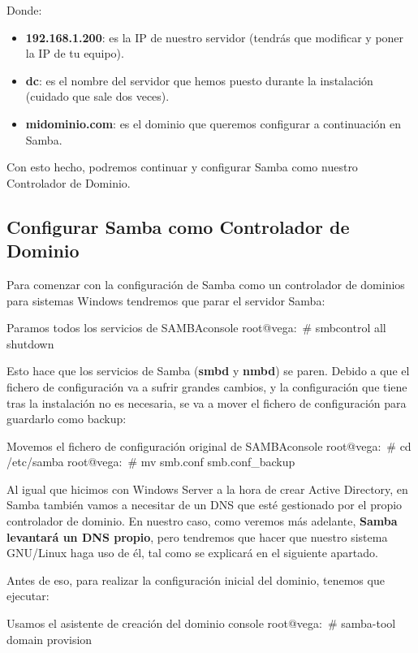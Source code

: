 Donde:
\begin{itemize}
    \item \textbf{192.168.1.200}: es la IP de nuestro servidor (tendrás que modificar y poner la IP de tu equipo).
    \item \textbf{dc}: es el nombre del servidor que hemos puesto durante la instalación (cuidado que sale dos veces).
    \item \textbf{midominio.com}: es el dominio que queremos configurar a continuación en Samba.
\end{itemize}
Con esto hecho, podremos continuar y configurar Samba como nuestro Controlador de Dominio.

\subsection{Configurar Samba como Controlador de Dominio}
Para comenzar con la configuración de Samba como un controlador de dominios para sistemas Windows tendremos que parar el servidor Samba:

\begin{mycode}{Paramos todos los servicios de SAMBA}{console}{}
root@vega:~# smbcontrol all shutdown
\end{mycode}

Esto hace que los servicios de Samba (\textbf{smbd} y \textbf{nmbd}) se paren. Debido a que el fichero de configuración va a sufrir grandes cambios, y la configuración que tiene tras la instalación no es necesaria, se va a mover el fichero de configuración para guardarlo como backup:

\begin{mycode}{Movemos el fichero de configuración original de SAMBA}{console}{}
root@vega:~# cd /etc/samba
root@vega:~# mv smb.conf smb.conf_backup
\end{mycode}

Al igual que hicimos con Windows Server a la hora de crear Active Directory, en Samba también vamos a necesitar de un DNS que esté gestionado por el propio controlador de dominio. En nuestro caso, como veremos más adelante, \textbf{Samba levantará un DNS propio}, pero tendremos que hacer que nuestro sistema GNU/Linux haga uso de él, tal como se explicará en el siguiente apartado.

Antes de eso, para realizar la configuración inicial del dominio, tenemos que ejecutar:

\begin{mycode}{Usamos el asistente de creación del dominio }{console}{}
root@vega:~# samba-tool domain provision
\end{mycode}

